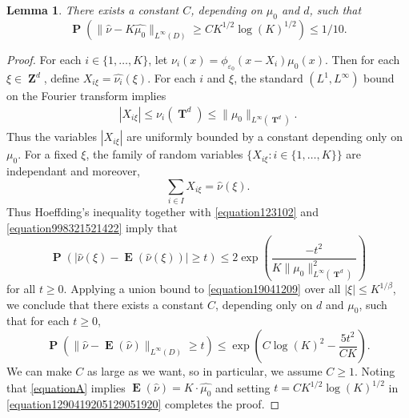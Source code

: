 \documentclass[12pt,reqno]{article}
\numberwithin{equation}{section}
\DeclareMathOperator{\ZZ}{\mathbf{Z}}
\DeclareMathOperator{\TT}{\mathbf{T}}
\newtheorem{lemma}[theorem]{Lemma}
\DeclareMathOperator{\EE}{\mathbf{E}}
\DeclareMathOperator{\PP}{\mathbf{P}}
\begin{document}
\begin{lemma} \label{lemma532952}
    There exists a constant $C$, depending on $\mu_0$ and $d$, such that
    \[ \PP \left( \| \widehat{\nu} - K \widehat{\mu_0} \|_{L^\infty(D)} \geq C K^{1/2} \log(K)^{1/2} \right) \leq 1/10. \]
\end{lemma}
\begin{proof}
    For each $i \in \{ 1, \dots, K \}$, let $\nu_i(x) = \phi_{\varepsilon_0}(x - X_i) \mu_0(x)$. Then for each $\xi \in \ZZ^d$, define $X_{i \xi} = \widehat{\nu_i}(\xi)$. For each $i$ and $\xi$, the standard $(L^1,L^\infty)$ bound on the Fourier transform implies
    \begin{equation} \label{equation123102}
    \begin{split}
        |X_{i\xi}| \leq \nu_i(\TT^d) \leq \| \mu_0 \|_{L^\infty(\TT^d)}.
    \end{split}
    \end{equation}
    Thus the variables $|X_{i \xi}|$ are uniformly bounded by a constant depending only on $\mu_0$. For a fixed $\xi$, the family of random variables $\{ X_{i \xi} : i \in \{ 1, \dots, K \} \}$ are independant and moreover,
    \begin{equation} \label{equation998321521422}
        \sum_{i \in I} X_{i \xi} = \widehat{\nu}(\xi).
    \end{equation}
    Thus Hoeffding's inequality together with \eqref{equation123102} and \eqref{equation998321521422} imply that
    \begin{equation} \label{equation19041209}
        \PP \left( \left| \widehat{\nu}(\xi) - \EE(\widehat{\nu}(\xi)) \right| \geq t \right) \leq 2 \exp \left( \frac{-t^2}{K \| \mu_0 \|_{L^\infty(\TT^d)}^2} \right)
    \end{equation}
    for all $t \geq 0$. Applying a union bound to \eqref{equation19041209} over all $|\xi| \leq K^{1/\beta}$, we conclude that there exists a constant $C$, depending only on $d$ and $\mu_0$, such that for each $t \geq 0$,
    \begin{equation} \label{equation1290419205129051920}
        \PP \left( \| \widehat{\nu} - \EE(\widehat{\nu}) \|_{L^\infty(D)} \geq t \right) \leq \exp \left( C \log(K)^2 - \frac{5 t^2}{C K} \right).
    \end{equation}
    We can make $C$ as large as we want, so in particular, we assume $C \geq 1$. Noting that \eqref{equationA} implies $\EE(\widehat{\nu}) = K \cdot \widehat{\mu_0}$ and setting $t = C K^{1/2} \log(K)^{1/2}$ in \eqref{equation1290419205129051920} completes the proof.
\end{proof}
\end{document}
